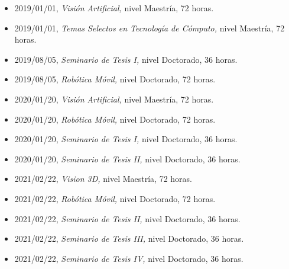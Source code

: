 \begin{itemize} 
\item 2019/01/01, \textit{ Visión Artificial,} nivel Maestría, 72 horas. 
\item 2019/01/01, \textit{ Temas Selectos en Tecnología de Cómputo,} nivel Maestría, 72 horas. 
\item 2019/08/05, \textit{ Seminario de Tesis I,} nivel Doctorado, 36 horas. 
\item 2019/08/05, \textit{ Robótica Móvil,} nivel Doctorado, 72 horas. 
\item 2020/01/20, \textit{ Visión Artificial,} nivel Maestría, 72 horas. 
\item 2020/01/20, \textit{ Robótica Móvil,} nivel Doctorado, 72 horas. 
\item 2020/01/20, \textit{ Seminario de Tesis I,} nivel Doctorado, 36 horas. 
\item 2020/01/20, \textit{ Seminario de Tesis II,} nivel Doctorado, 36 horas. 
\item 2021/02/22, \textit{ Vision 3D,} nivel Maestría, 72 horas. 
\item 2021/02/22, \textit{ Robótica Móvil,} nivel Doctorado, 72 horas. 
\item 2021/02/22, \textit{ Seminario de Tesis II,} nivel Doctorado, 36 horas. 
\item 2021/02/22, \textit{ Seminario de Tesis III,} nivel Doctorado, 36 horas. 
\item 2021/02/22, \textit{ Seminario de Tesis IV,} nivel Doctorado, 36 horas. 
\end{itemize} 
